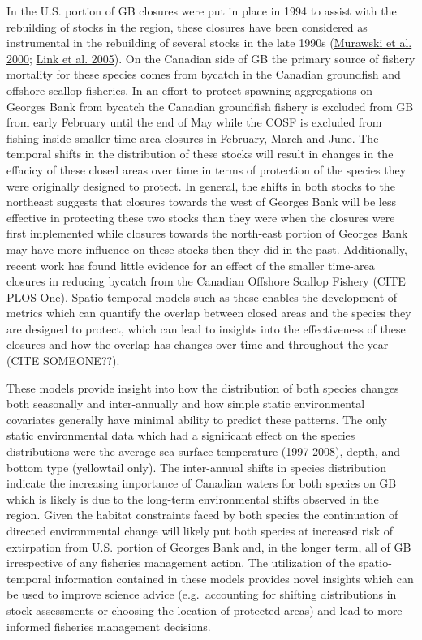 \documentclass[
]{article}
\begin{document}
In the U.S. portion of GB closures were put in place in 1994 to assist with the rebuilding of stocks in the region, these closures have been considered as instrumental in the rebuilding of several stocks in the late 1990s (\protect\hyperlink{ref-murawskiLargescaleClosedAreas2000}{Murawski et al. 2000}; \protect\hyperlink{ref-linkEffectsAreaClosures2005}{Link et al. 2005}). On the Canadian side of GB the primary source of fishery mortality for these species comes from bycatch in the Canadian groundfish and offshore scallop fisheries. In an effort to protect spawning aggregations on Georges Bank from bycatch the Canadian groundfish fishery is excluded from GB from early February until the end of May while the COSF is excluded from fishing inside smaller time-area closures in February, March and June. The temporal shifts in the distribution of these stocks will result in changes in the effacicy of these closed areas over time in terms of protection of the species they were originally designed to protect. In general, the shifts in both stocks to the northeast suggests that closures towards the west of Georges Bank will be less effective in protecting these two stocks than they were when the closures were first implemented while closures towards the north-east portion of Georges Bank may have more influence on these stocks then they did in the past. Additionally, recent work has found little evidence for an effect of the smaller time-area closures in reducing bycatch from the Canadian Offshore Scallop Fishery (CITE PLOS-One). Spatio-temporal models such as these enables the development of metrics which can quantify the overlap between closed areas and the species they are designed to protect, which can lead to insights into the effectiveness of these closures and how the overlap has changes over time and throughout the year (CITE SOMEONE??).

These models provide insight into how the distribution of both species changes both seasonally and inter-annually and how simple static environmental covariates generally have minimal ability to predict these patterns. The only static environmental data which had a significant effect on the species distributions were the average sea surface temperature (1997-2008), depth, and bottom type (yellowtail only). The inter-annual shifts in species distribution indicate the increasing importance of Canadian waters for both species on GB which is likely is due to the long-term environmental shifts observed in the region. Given the habitat constraints faced by both species the continuation of directed environmental change will likely put both species at increased risk of extirpation from U.S. portion of Georges Bank and, in the longer term, all of GB irrespective of any fisheries management action. The utilization of the spatio-temporal information contained in these models provides novel insights which can be used to improve science advice (e.g.~accounting for shifting distributions in stock assessments or choosing the location of protected areas) and lead to more informed fisheries management decisions.
\end{document}
